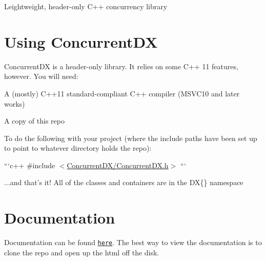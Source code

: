 Leightweight, header-\/only C++ concurrency library

\section*{Using Concurrent\-D\-X}

Concurrent\-D\-X is a header-\/only library. It relies on some C++ 11 features, however. You will need\-:


\begin{DoxyItemize}
\item A (mostly) C++11 standard-\/compliant C++ compiler (M\-S\-V\-C10 and later works)
\item A copy of this repo
\item To do the following with your project (where the include paths have been set up to point to whatever directory holds the repo)\-:
\end{DoxyItemize}

```c++ \#include $<$\hyperlink{_concurrent_d_x_8h_source}{Concurrent\-D\-X/\-Concurrent\-D\-X.\-h}$>$ ```
\begin{DoxyItemize}
\item ...and that's it! All of the classes and containers are in the D\-X\{\} namespace
\end{DoxyItemize}

\section*{Documentation}

Documentation can be found \href{/html/index.html}{\tt here}. The best way to view the documentation is to clone the repo and open up the html off the disk. 